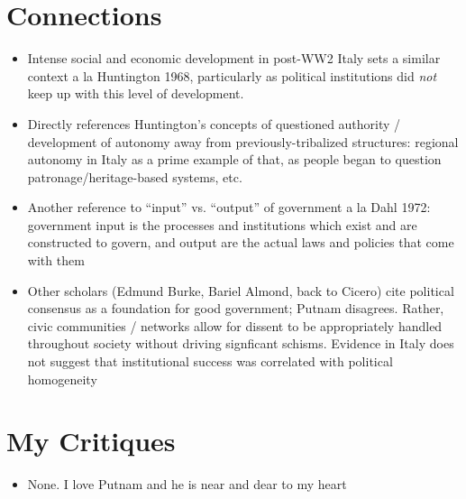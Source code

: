 \documentclass[12pt]{article}
\begin{document}
\section{Connections}

\begin{itemize}
    \item Intense social and economic development in post-WW2 Italy sets a similar context a la Huntington 1968, particularly as political institutions did \textit{not} keep up with this level of development. 
    \item Directly references Huntington's concepts of questioned authority / development of autonomy away from previously-tribalized structures: regional autonomy in Italy as a prime example of that, as people began to question patronage/heritage-based systems, etc.
    \item Another reference to ``input'' vs. ``output'' of government a la Dahl 1972: government input is the processes and institutions which exist and are constructed to govern, and output are the actual laws and policies that come with them
    \item Other scholars (Edmund Burke, Bariel Almond, back to Cicero) cite political consensus as a foundation for good government; Putnam disagrees. Rather, civic communities / networks allow for dissent to be appropriately handled throughout society without driving signficant schisms. Evidence in Italy does not suggest that institutional success was correlated with political homogeneity
    
\end{itemize}


\section{My Critiques}

\begin{itemize}
    \item None. I love Putnam and he is near and dear to my heart
\end{itemize}
\end{document}
